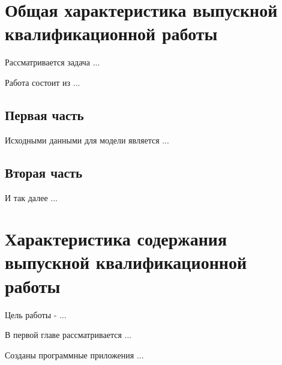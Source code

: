 \documentclass[nocolumnsxix, nocolumnxxxi, nocolumnxxxii]{eskdtext}
\begin{document}

  \section*{Общая характеристика выпускной квалификационной работы}
  Рассматривается задача ...

  Работа состоит из ...

  \subsection*{Первая часть}
  Исходными данными для модели является ...

  \subsection*{Вторая часть}
  И так далее ...

  \section*{Характеристика содержания выпускной квалификационной работы}
  Цель работы - ...

  В первой главе рассматривается ...

  Созданы программные приложения ...
\end{document}
